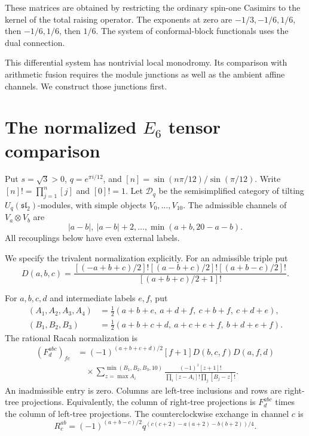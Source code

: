 These matrices are obtained by restricting the ordinary spin-one Casimirs
to the kernel of the total raising operator. The exponents at zero are
$-1/3,-1/6,1/6$, then $-1/6,1/6$, then $1/6$.
The system of conformal-block functionals uses the dual connection.

This differential system has nontrivial local monodromy. Its comparison
with arithmetic fusion requires the module junctions as well as the
ambient affine channels. We construct those junctions first.

\section{The normalized \texorpdfstring{$E_6$}{E6} tensor comparison}
\label{v4-arith:asi:sec:e6-tensor}

Put $s=\sqrt3>0$, $q=e^{\pi i/12}$, and
$[n]=\sin(n\pi/12)/\sin(\pi/12)$. Write $[n]!=\prod_{j=1}^n[j]$ and
$[0]!=1$. Let $\mathcal D_q$ be the semisimplified category of tilting
$U_q(\mathfrak{sl}_2)$-modules, with simple objects $V_0,\ldots,V_{10}$.
The admissible channels of $V_a\otimes V_b$ are
\begin{equation}\label{v4-arith:asi:su2-fusion}
 |a-b|,\ |a-b|+2,\ldots,\min(a+b,20-a-b).
\end{equation}
All recouplings below have even external labels.

We specify the trivalent normalization explicitly. For an admissible
triple put
\[
 D(a,b,c)=
 \frac{[(-a+b+c)/2]![(a-b+c)/2]![(a+b-c)/2]!}
      {[(a+b+c)/2+1]!}.
\]

For $a,b,c,d$ and intermediate labels $e,f$, put
\[
 \begin{split}
 (A_1,A_2,A_3,A_4)
   &=\tfrac12(a+b+e,\ a+d+f,\ c+b+f,\ c+d+e),\\
 (B_1,B_2,B_3)
   &=\tfrac12(a+b+c+d,\ a+c+e+f,\ b+d+e+f).
 \end{split}
\]
The rational Racah normalization is
\begin{equation}\label{v4-arith:asi:q-racah}
 \begin{aligned}
 (F^{abc}_d)_{fe}
 &=(-1)^{(a+b+c+d)/2}[f+1]D(b,c,f)D(a,f,d)\\
 &\quad{}\times
 \sum_{z=\max A_i}^{\min(B_1,B_2,B_3,10)}
 \frac{(-1)^z[z+1]!}{\prod_i[z-A_i]!\prod_j[B_j-z]!}.
 \end{aligned}
\end{equation}
An inadmissible entry is zero. Columns are left-tree inclusions and rows
are right-tree projections. Equivalently, the column of right-tree
projections is $F^{abc}_d$ times the column of left-tree projections.
The counterclockwise exchange in channel $c$ is
\[
 R^{ab}_c=(-1)^{(a+b-c)/2}
 q^{(c(c+2)-a(a+2)-b(b+2))/4}.
\]

